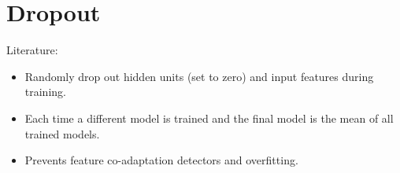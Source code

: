 \section{Dropout}\label{sec:dropout}
Literature: \cite{Hinton2012,Hinton2014,Wang2013}

\begin{itemize}
\item Randomly drop out hidden units (set to zero) and input features during training.
\item Each time a different model is trained and the final model is the mean of all trained models.
\item Prevents feature co-adaptation detectors and overfitting.
\end{itemize}

